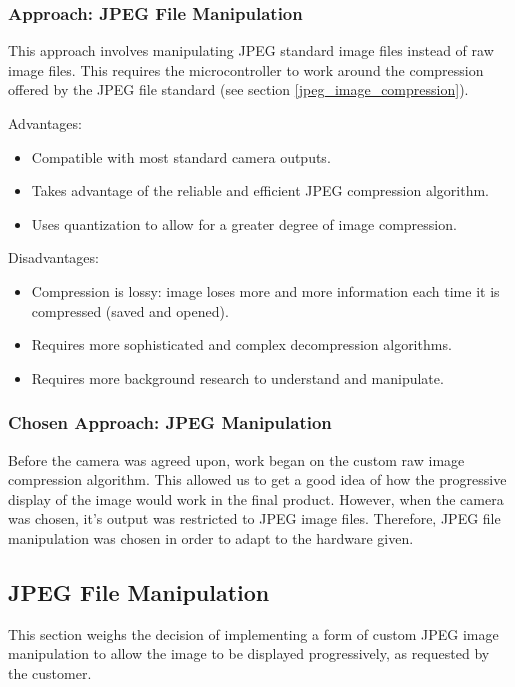 \subsubsection{Approach: JPEG File Manipulation}

This approach involves manipulating JPEG standard image 
files instead of raw image files. This requires the
microcontroller to work around the compression offered
by the JPEG file standard (see section \ref{jpeg_image_compression}).

Advantages:
\begin{itemize}
	\item Compatible with most standard
		camera outputs.
	\item Takes advantage of the reliable and
		efficient JPEG compression algorithm.
	\item Uses quantization to allow for a greater
		degree of image compression.
\end{itemize}

Disadvantages:
\begin{itemize}
	\item Compression is lossy: image loses 
		more and more information 
		each time it is compressed 
		(saved and opened).
	\item Requires more sophisticated and complex
		decompression algorithms.
	\item Requires more background research to
		understand and manipulate.
\end{itemize}

\subsubsection{Chosen Approach: JPEG Manipulation}

Before the camera was agreed upon, work began on the
custom raw image compression algorithm. This
allowed us to get a good idea of how the progressive
display of the image would work in the final product.
However, when the camera was chosen, it's output
was restricted to JPEG image files. Therefore, JPEG 
file manipulation was chosen in order to adapt to
the hardware given.

\subsection{JPEG File Manipulation}
\label{sec:jpegmanipulation}

This section weighs the decision of implementing a 
form of custom JPEG image manipulation to allow the 
image to be displayed progressively, as requested by the customer.

